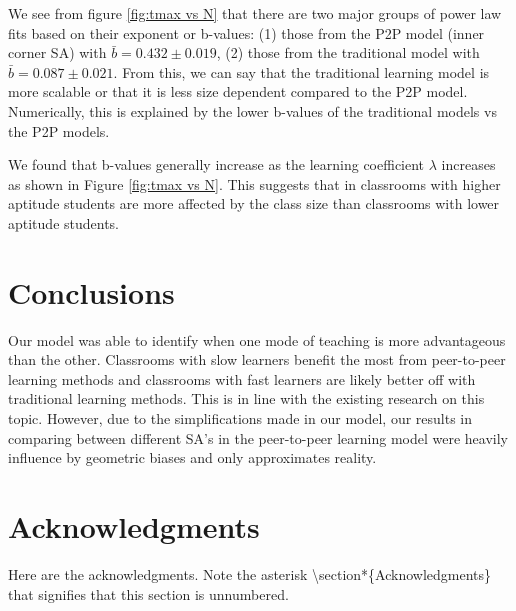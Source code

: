 \documentclass[10pt,a4paper,twoside]{article}
\begin{document}
\noindent We see from figure \ref{fig:tmax vs N} that there are two major groups of power law fits based on their exponent or b-values: (1) those from the P2P model (inner corner SA) with $\bar{b} = 0.432 \pm 0.019$, (2) those from the traditional model with $\bar{b}=0.087\pm0.021$. From this, we can say that the traditional learning model is more scalable or that it is less size dependent compared to the P2P model. Numerically, this is explained by the lower b-values of the traditional models vs the P2P models. 

\noindent We found that b-values generally increase as the learning coefficient $\lambda$ increases as shown in Figure \ref{fig:tmax vs N}. This suggests that in classrooms with higher aptitude students are more affected by the class size than classrooms with lower aptitude students.


\section{Conclusions}
Our model was able to identify when one mode of teaching is more advantageous than the other. Classrooms with slow learners benefit the most from peer-to-peer learning methods and classrooms with fast learners are likely better off with traditional learning methods. This is in line with the existing research on this topic. However, due to the simplifications made in our model, our results in comparing between different SA's in the peer-to-peer learning model were heavily influence by geometric biases and only approximates reality. 
\section*{Acknowledgments}
Here are the acknowledgments. Note the asterisk \textbackslash{\ttfamily section*}\{{\ttfamily Acknowledgments}\} that signifies that this section is unnumbered.



\end{document}
